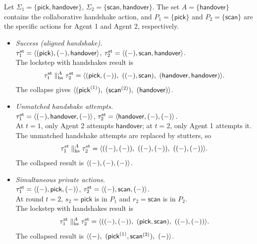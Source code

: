 \begin{example}
  Let \(\Sigma_1=\{\textsf{pick},\textsf{handover}\}\), \(\Sigma_2=\{\textsf{scan},\textsf{handover}\}\). The set \(A=\{\textsf{handover}\}\) contains the collaborative handshake action, and
  \( P_1=\{\textsf{pick}\} \) and \( P_2=\{\textsf{scan}\} \) are the specific actions for Agent 1 and Agent 2, respectively.
  \begin{itemize}
      \item \emph{Success (aligned handshake).}\\
      \(\tau^{\mathrm{st}}_1=\langle (\textsf{pick}),(-),\textsf{handover} \rangle \), \(\tau^{\mathrm{st}}_2=\langle (-),\textsf{scan},\textsf{handover} \rangle \).
      \\The lockstep with handshakes result is
      \[
      \taust_1 \parallel_{\mathrm{hs}}^{A} \taust_2
      =
      \trace{(\textsf{pick},(-)),\ ((-),\textsf{scan}),\ (\textsf{handover},\textsf{handover})}.
      \]
      The collapse gives \(\trace{(\textsf{pick}^{(1)}),\ (\textsf{scan}^{(2)}),\ (\textsf{handover})}\).
  
      \item \emph{Unmatched handshake attempts.}\\
      \(\tau^{\mathrm{st}}_1=\langle (-),\textsf{handover},(-) \rangle \), \(\tau^{\mathrm{st}}_2=\langle \textsf{handover},(-),(-) \rangle \).
      \\At \( t=1 \), only Agent 2 attempts \(\textsf{handover}\); at \( t=2 \), only Agent 1 attempts it.
      The unmatched handshake attempts are replaced by stutters, so
      \[
      \tau^{\mathrm{st}}_1 \parallel_{\mathrm{hs}}^{A} \tau^{\mathrm{st}}_2
      =
      \langle ((-),(-)),\ ((-),(-)),\ ((-),(-)) \rangle .
      \]
      The collapsed result is \(\langle (-),(-),(-) \rangle \).
      
      \item \emph{Simultaneous private actions.}\\
      \(\tau^{\mathrm{st}}_1=\langle (-),\textsf{pick},(-) \rangle \), \(\tau^{\mathrm{st}}_2=\langle (-),\textsf{scan},(-) \rangle \).
      \\At round \( t=2 \), \( s_2=\textsf{pick} \) is in $P_1$ and \( r_2=\textsf{scan} \) is in $P_2$.\\
      The lockstep with handshakes result is
      \[
      \taust_1 \parallel_{\mathrm{hs}}^{A} \taust_2
      =
      \trace{((-),(-)),\ (\textsf{pick},\textsf{scan}),\ ((-),(-))}.
      \]
      The collapsed result is \(\langle (-),\ (\textsf{pick}^{(1)}, \textsf{scan}^{(2)}),\ (-) \rangle \).
  \end{itemize}
  \end{example}

